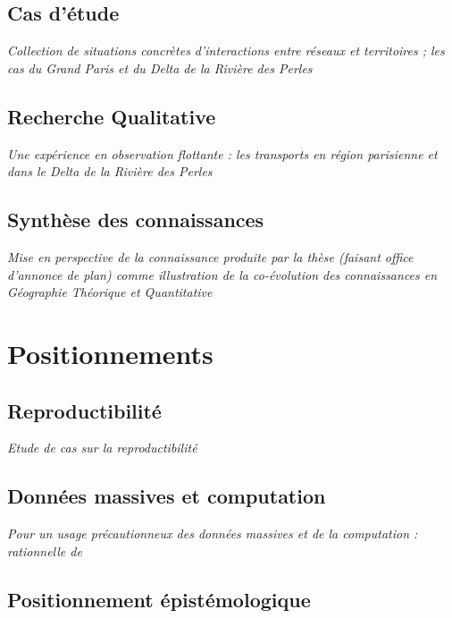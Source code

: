 \subsection{Cas d'étude}

\textit{Collection de situations concrètes d'interactions entre réseaux et territoires ; les cas du Grand Paris et du Delta de la Rivière des Perles}  


\subsection{Recherche Qualitative}

\textit{Une expérience en observation flottante : les transports en région parisienne et dans le Delta de la Rivière des Perles} 

\subsection{Synthèse des connaissances}

\textit{Mise en perspective de la connaissance produite par la thèse (faisant office d'annonce de plan) comme illustration de la co-évolution des connaissances en Géographie Théorique et Quantitative~\cite{raimbault2017theo}}




\section{Positionnements}


\subsection{Reproductibilité}

\textit{Etude de cas sur la reproductibilité}

\subsection{Données massives et computation}

\textit{Pour un usage précautionneux des données massives et de la computation : rationnelle de~\cite{raimbault2016cautious}}


\subsection{Positionnement épistémologique}






